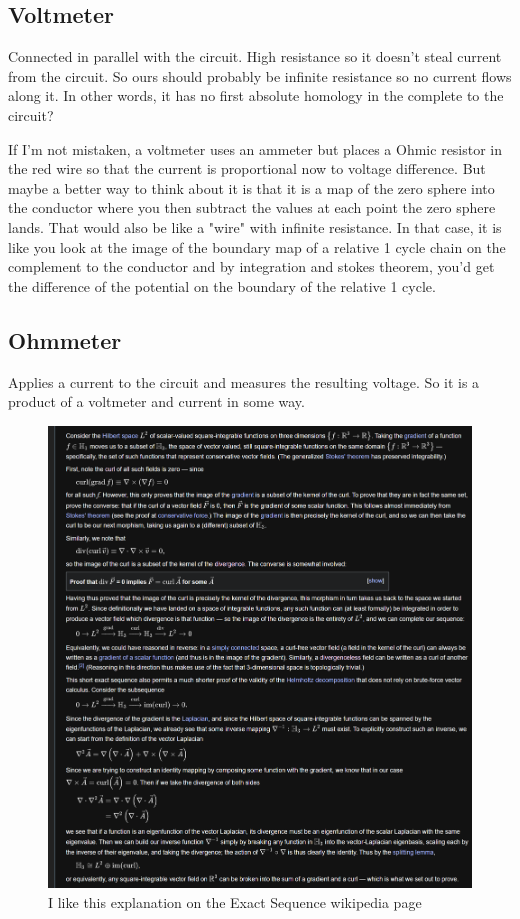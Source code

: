 \documentclass{article}
\begin{document}
\subsection{Voltmeter}
Connected in parallel with the circuit. 
High resistance so it doesn't steal current from the circuit. 
So ours should probably be infinite resistance so no current flows along it.
In other words, it has no first absolute homology in the complete to the circuit?

If I'm not mistaken, a voltmeter uses an ammeter but places a Ohmic resistor in the red wire so that the current is proportional now to voltage difference. 
But maybe a better way to think about it is that it is a map of the zero sphere into the conductor where you then subtract the values at each point the zero sphere lands. 
That would also be like a "wire" with infinite resistance.
In that case, it is like you look at the image of the boundary map of a relative 1 cycle chain on the complement to the conductor and by integration and stokes theorem, you'd get the difference of the potential on the boundary of the relative 1 cycle.

\subsection{Ohmmeter}
Applies a current to the circuit and measures the resulting voltage. 
So it is a product of a voltmeter and current in some way.


\begin{figure}
    \centering
    \includegraphics[width=\textwidth]{figures/splitting.png}
    \caption{I like this explanation on the Exact Sequence wikipedia page}
\end{figure}




\end{document}

